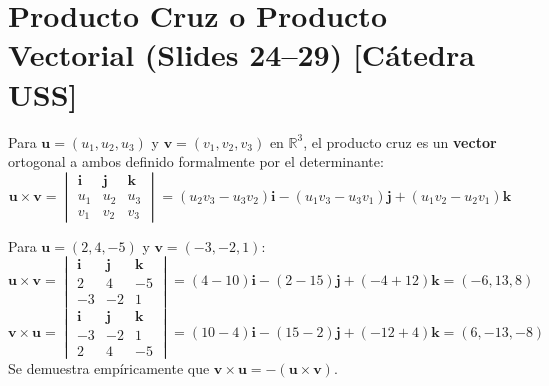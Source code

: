 \documentclass[10pt,letterpaper]{article}
\newcommand{\iu}{\mathbf{i}}
\newcommand{\ju}{\mathbf{j}}
\newcommand{\ku}{\mathbf{k}}
\newcommand{\vu}{\mathbf{u}}
\newcommand{\vv}{\mathbf{v}}
\begin{document}
\section{Producto Cruz o Producto Vectorial (Slides 24--29) [Cátedra USS]}

\begin{cajaDefinicion}
Para $\vu = (u_1, u_2, u_3)$ y $\vv = (v_1, v_2, v_3)$ en $\mathbb{R}^3$, el producto cruz es un \textbf{vector} ortogonal a ambos definido formalmente por el determinante:
\[
\vu \times \vv = \begin{vmatrix} \iu & \ju & \ku \\ u_1 & u_2 & u_3 \\ v_1 & v_2 & v_3 \end{vmatrix} = (u_2 v_3 - u_3 v_2)\iu - (u_1 v_3 - u_3 v_1)\ju + (u_1 v_2 - u_2 v_1)\ku
\]
\end{cajaDefinicion}

\begin{cajaEjemplo}
Para $\vu = (2, 4, -5)$ y $\vv = (-3, -2, 1)$:
\[
\vu \times \vv = \begin{vmatrix} \iu & \ju & \ku \\ 2 & 4 & -5 \\ -3 & -2 & 1 \end{vmatrix} = (4 - 10)\iu - (2 - 15)\ju + (-4 + 12)\ku = (-6, 13, 8)
\]
\[
\vv \times \vu = \begin{vmatrix} \iu & \ju & \ku \\ -3 & -2 & 1 \\ 2 & 4 & -5 \end{vmatrix} = (10 - 4)\iu - (15 - 2)\ju + (-12 + 4)\ku = (6, -13, -8)
\]
Se demuestra empíricamente que $\vv \times \vu = -(\vu \times \vv)$.
\end{cajaEjemplo}
\end{document}
